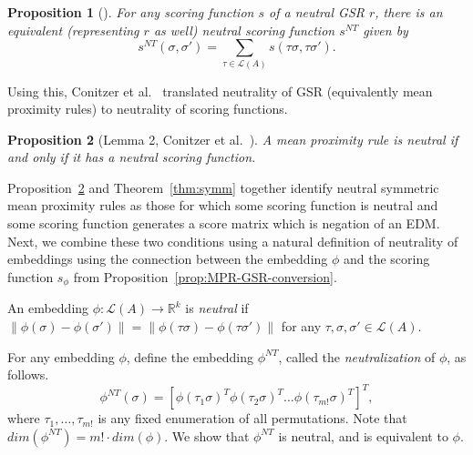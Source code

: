 \documentclass[10pt,letterpaper]{article}
\newcommand{\calL}{{\mathcal{L}}}
\newcommand{\rank}{{\calL(A)}}
\newtheorem{proposition}{Proposition}
\newenvironment{definition}[1][Definition]{\begin{trivlist}
\item[\hskip \labelsep {\bfseries #1}]}{\end{trivlist}}
\newcommand{\nt}{NT}
\begin{document}
\begin{proposition}[\cite{CRX09}] For any scoring function $s$ of a neutral GSR $r$, there is an equivalent (representing $r$ as well) neutral scoring function $s^{\nt}$ given by 
\begin{equation}
s^{\nt}(\sigma,\sigma') = \sum_{\tau \in \rank} s(\tau \sigma, \tau \sigma').
\label{eqn:s-nt}
\end{equation}
\label{prop:neutral-scoring-equivalent}
\end{proposition}

Using this, Conitzer et al.~\cite{CRX09} translated neutrality of GSR (equivalently mean proximity rules) to neutrality of scoring functions.
\begin{proposition}[Lemma 2, Conitzer et al.~\cite{CRX09}]
A mean proximity rule is neutral if and only if it has a neutral scoring function.
\label{prop:gsr-neutral}
\end{proposition}

Proposition~\ref{prop:gsr-neutral} and Theorem~\ref{thm:symm} together identify neutral symmetric mean proximity rules as those for which some scoring function is neutral and some scoring function generates a score matrix which is negation of an EDM. Next, we combine these two conditions using a natural definition of neutrality of embeddings using the connection between the embedding $\phi$ and the scoring function $s_{\phi}$ from Proposition~\ref{prop:MPR-GSR-conversion}.

\begin{definition}[Neutral Embedding]
An embedding $\phi:\rank \rightarrow \mathbb{R}^k$ is \emph{neutral} if $\|\phi(\sigma)-\phi(\sigma')\| = \|\phi(\tau \sigma)-\phi(\tau\sigma')\|$ for any $\tau,\sigma,\sigma' \in \rank$.
\end{definition}

For any embedding $\phi$, define the embedding $\phi^{\nt}$, called the \emph{neutralization} of $\phi$, as follows. 
\begin{equation}
\phi^{\nt}(\sigma) = [\phi(\tau_1 \sigma)^T \phi(\tau_2 \sigma)^T \ldots \phi(\tau_{m!} \sigma)^T]^T,
\label{eqn:phi-nt}
\end{equation}
where $\tau_1,\ldots,\tau_{m!}$ is any fixed enumeration of all permutations. Note that $dim(\phi^{\nt}) = m! \cdot dim(\phi)$. We show that $\phi^{\nt}$ is neutral, and is equivalent to $\phi$. 
\end{document}
